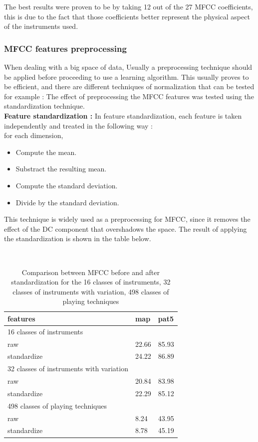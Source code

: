 \documentclass[hidelinks,12pt]{report}
\begin{document}
The best results were proven to be by taking 12 out of the 27 MFCC coefficients, this is due to the fact that those coefficients better represent the physical aspect of the instruments used.

\subsubsection{MFCC features preprocessing}
When dealing with a big space of data, Usually a preprocessing technique should be applied before proceeding to use a learning algorithm. This usually proves to be efficient, and there are  different techniques of normalization that can be tested for example :   The effect of preprocessing the MFCC features was tested using the standardization technique.\\
\textbf{Feature standardization :}
In feature standardization, each feature is taken independently and treated in the following way : \\
for each dimension,
\begin{itemize}
\item Compute the mean.
\item Substract the resulting mean.
\item Compute the standard deviation.
\item Divide by the standard deviation.
\end{itemize}
This technique is widely used as a preprocessing for MFCC, since it removes the effect of the DC component that overshadows the space. The result of applying the standardization is shown in the table below.
\begin{table}[H] 
\begin{center} 
\ 
 \setlength{\tabcolsep}{.16667em} 
\begin{tabular}{|l|l|l|} 
\hline
features & map & pat5  \\ 
\hline
\hline
16 classes of instruments    \\ 
\hline 
raw & 22.66 & 85.93  \\ 
standardize & 24.22 & 86.89  \\  

 \hline
 32 classes of instruments with variation \\

\hline 
raw & 20.84 & 83.98 \\ 
standardize & 22.29 & 85.12  \\ 


\hline 
498 classes of playing techniques \\
\hline
raw & 8.24 & 43.95  \\ 
standardize & 8.78 & 45.19  \\ \hline 
\end{tabular} 
\end{center} 
\caption{Comparison between MFCC before and after standardization for the 16 classes of instruments, 32 classes of instruments with variation, 498 classes of playing techniques} 
\label{me} 
\end{table}
\end{document}
